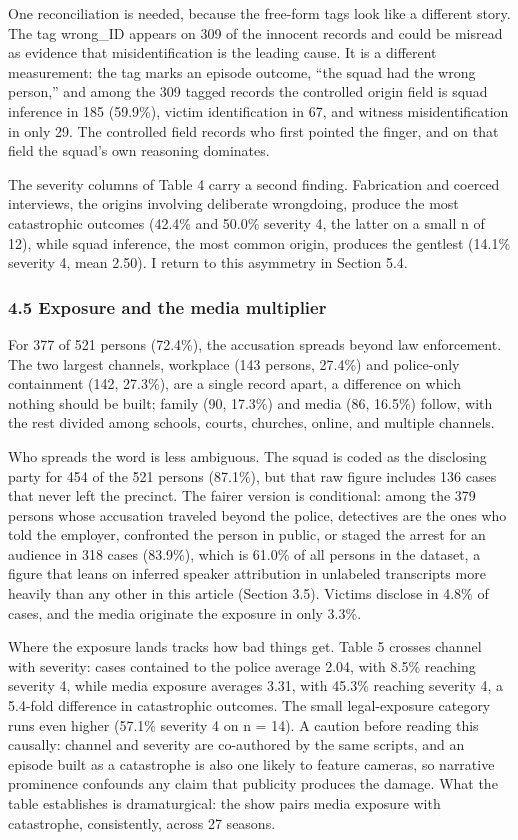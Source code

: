 \documentclass[
]{article}
\begin{document}
One reconciliation is needed, because the free-form tags look like a
different story. The tag wrong\_ID appears on 309 of the innocent
records and could be misread as evidence that misidentification is the
leading cause. It is a different measurement: the tag marks an episode
outcome, ``the squad had the wrong person,'' and among the 309 tagged
records the controlled origin field is squad inference in 185 (59.9\%),
victim identification in 67, and witness misidentification in only 29.
The controlled field records who first pointed the finger, and on that
field the squad's own reasoning dominates.

The severity columns of Table 4 carry a second finding. Fabrication and
coerced interviews, the origins involving deliberate wrongdoing, produce
the most catastrophic outcomes (42.4\% and 50.0\% severity 4, the latter
on a small n of 12), while squad inference, the most common origin,
produces the gentlest (14.1\% severity 4, mean 2.50). I return to this
asymmetry in Section 5.4.

\subsubsection{4.5 Exposure and the media
multiplier}\label{exposure-and-the-media-multiplier}

For 377 of 521 persons (72.4\%), the accusation spreads beyond law
enforcement. The two largest channels, workplace (143 persons, 27.4\%)
and police-only containment (142, 27.3\%), are a single record apart, a
difference on which nothing should be built; family (90, 17.3\%) and
media (86, 16.5\%) follow, with the rest divided among schools, courts,
churches, online, and multiple channels.

Who spreads the word is less ambiguous. The squad is coded as the
disclosing party for 454 of the 521 persons (87.1\%), but that raw
figure includes 136 cases that never left the precinct. The fairer
version is conditional: among the 379 persons whose accusation traveled
beyond the police, detectives are the ones who told the employer,
confronted the person in public, or staged the arrest for an audience in
318 cases (83.9\%), which is 61.0\% of all persons in the dataset, a
figure that leans on inferred speaker attribution in unlabeled
transcripts more heavily than any other in this article (Section 3.5).
Victims disclose in 4.8\% of cases, and the media originate the exposure
in only 3.3\%.

Where the exposure lands tracks how bad things get. Table 5 crosses
channel with severity: cases contained to the police average 2.04, with
8.5\% reaching severity 4, while media exposure averages 3.31, with
45.3\% reaching severity 4, a 5.4-fold difference in catastrophic
outcomes. The small legal-exposure category runs even higher (57.1\%
severity 4 on n = 14). A caution before reading this causally: channel
and severity are co-authored by the same scripts, and an episode built
as a catastrophe is also one likely to feature cameras, so narrative
prominence confounds any claim that publicity produces the damage. What
the table establishes is dramaturgical: the show pairs media exposure
with catastrophe, consistently, across 27 seasons.
\end{document}
